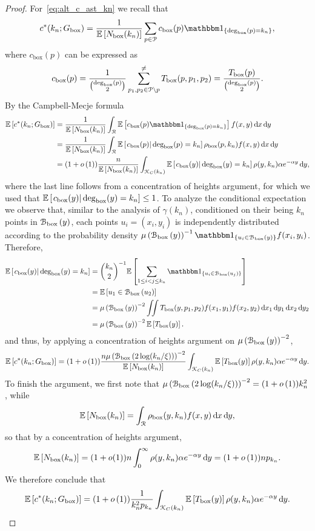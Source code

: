 \begin{proof}
For~\eqref{eq:alt_c_ast_kn} we recall that
\[
	c^\ast(k_n; \Gbox) = \frac{1}{\Exp{\Nbox(k_n)}} \sum_{p \in \Pcal} c_{\text{box}}(p)\ind{\Dbox(p) = k_n},
\]
where $c_{\text{box}}(p)$ can be expressed as
\[
	c_{\text{box}}(p) = \frac{1}{\binom{\text{deg}_{\text{box}}(p)}{2}} \sum_{p_1, p_2 \in {\mathcal P} \setminus p}^{\ne} T_{\text{box}}(p,p_1,p_2)
	= \frac{T_{\text{box}}(p)}{\binom{\text{deg}_{\text{box}}(p)}{2}}.
\]
By the Campbell-Mecje formula
\begin{align*}
	\Exp{c^\ast(k_n; \Gbox)} 
	&= \frac{1}{\Exp{\Nbox(k_n)}} \int_{\Rcal} \Exp{c_{\text{box}}(p)\ind{\Dbox(p) = k_n}} f(x,y) \dd x \dd y\\
	&= \frac{1}{\Exp{\Nbox(k_n)}} \int_{\Rcal} \CExp{c_{\text{box}}(p)}{\Dbox(p) = k_n}\rho_{\text{box}}(p,k_n) 
		f(x,y) \dd x \dd y\\
	&= (1+\smallO{1})\frac{n}{\Exp{\Nbox(k_n)}} \int_{\Kcal_C(k_n)} \CExp{c_{\text{box}}(y)}{\Dbox(y) = k_n}
		\rho(y,k_n) \alpha e^{-\alpha y} \dd y,
\end{align*}
where the last line follows from a concentration of heights argument, for which we used that $\mathbb{E}\left[\left.c_{\text{box}}(y)\right|\text{deg}_{\text{box}}(y) = k_n\right] \le 1$. To analyze the conditional expectation we observe that, similar to the analysis of $\gamma(k_n)$, conditioned on their being $k_n$ points in ${\mathcal B}_{\text{box}}\left(y\right)$, each points $u_i = (x_i,y_i)$ is independently distributed according to the probability density $\Mu{\BallPon{y}}^{-1} \ind{u_i \in \BallPon{y}} f(x_i,y_i)$. Therefore,
\begin{align*}
	\CExp{c_{\text{box}}(y)}{\Dbox(y) = k_n}
	&= \binom{k_n}{2}^{-1} \Exp{\sum_{1 \le i < j \le k_n} \ind{u_i \in \BallPon{u_j}}} \\
	&= \Exp{u_1 \in \BallPon{u_2}} \\
	&= \Mu{\BallPon{y}}^{-2} \iint T_{\text{box}}(y,p_1,p_2) f(x_1,y_1) f(x_2,y_2) 
		\dd x_1 \dd y_1 \dd x_2 \dd y_2\\
	&= \Mu{\BallPon{y}}^{-2} \Exp{T_{\text{box}}(y)}.
\end{align*}
and thus, by applying a concentration of heights argument on $\mu\left({\mathcal B}_{\text{box}}\left(y\right)\right)^{-2}$,
\[
	\mathbb{E}\left[c^\ast(k_n; G_{\text{box}})\right] = (1 + o\left(1\right)) \frac{n \mu\left({\mathcal B}_{\text{box}}\left(2\log(k_n/\xi)\right)\right)^{-2}}{\mathbb{E}\left[N_{\text{box}}(k_n)\right]} \int_{{\mathcal K}_C(k_n)} \mathbb{E}\left[T_{\text{box}}(y)\right] \rho(y,k_n) \alpha e^{-\alpha y} \operatorname{\mathrm{d}\hspace{-2pt}} y.
\]
To finish the argument, we first note that $\mu\left({\mathcal B}_{\text{box}}\left(2\log(k_n/\xi)\right)\right)^{-2} = (1+o\left(1\right))k_n^2$, while
\[
	\mathbb{E}\left[N_{\text{box}}(k_n)\right] = \int_{{\mathcal R}} \rho_{\text{box}}(y,k_n) f(x,y) \operatorname{\mathrm{d}\hspace{-2pt}} x \operatorname{\mathrm{d}\hspace{-2pt}} y,
\]
so that by a concentration of heights argument,
\[
	\mathbb{E}\left[N_{\text{box}}(k_n)\right] = (1+o(1)) n \int_{0}^\infty \rho(y,k_n) \alpha e^{-\alpha y} \operatorname{\mathrm{d}\hspace{-2pt}} y 
	= (1+o\left(1\right)) n p_{k_n}.
\]
We therefore conclude that
\[
	\mathbb{E}\left[c^\ast(k_n; G_{\text{box}})\right] = (1 + o\left(1\right)) \frac{1}{k_n^2 p_{k_n}} \int_{{\mathcal K}_C(k_n)} 
		\mathbb{E}\left[T_{\text{box}}(y)\right] \rho(y,k_n) \alpha e^{-\alpha y} \operatorname{\mathrm{d}\hspace{-2pt}} y.
\]



\end{proof}
